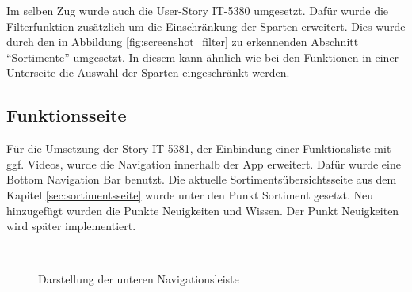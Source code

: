 Im selben Zug wurde auch die User-Story IT-5380 umgesetzt. Dafür wurde die Filterfunktion zusätzlich um die Einschränkung der Sparten erweitert. Dies wurde durch den in Abbildung \ref{fig:screenshot_filter} zu erkennenden Abschnitt \enquote{Sortimente} umgesetzt. In diesem kann ähnlich wie bei den Funktionen in einer Unterseite die Auswahl der Sparten eingeschränkt werden.

\FloatBarrier
\subsection{Funktionsseite}
\label{sec:funktionen}


Für die Umsetzung der Story IT-5381, der Einbindung einer Funktionsliste mit ggf. Videos, wurde die Navigation innerhalb der App erweitert. Dafür wurde eine Bottom Navigation Bar benutzt. Die aktuelle Sortimentsübersichtsseite aus dem Kapitel \ref{sec:sortimentsseite} wurde unter den Punkt Sortiment gesetzt. Neu hinzugefügt wurden die Punkte Neuigkeiten und Wissen. Der Punkt Neuigkeiten wird später implementiert.

\begin{figure}[!htb]
    \centering
    \begin{minipage}[t]{0.4\textwidth}
        \caption{Darstellung der unteren Navigationsleiste}
        \\
        \label{fig:screenshot_bottom_nav}
    \end{minipage}
\end{figure}


